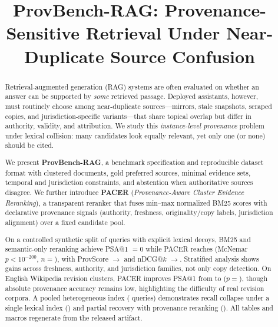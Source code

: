 \documentclass[sigconf,anonymous,review]{acmart}
\title{ProvBench-RAG: Provenance-Sensitive Retrieval Under Near-Duplicate Source Confusion}
\begin{document}
\begin{abstract}
Retrieval-augmented generation (RAG) systems are often evaluated on whether an answer can be supported by \emph{some} retrieved passage.
Deployed assistants, however, must routinely choose among near-duplicate sources---mirrors, stale snapshots, scraped copies, and jurisdiction-specific variants---that share topical overlap but differ in authority, validity, and attribution.
We study this \emph{instance-level provenance} problem under lexical collision: many candidates look equally relevant, yet only one (or none) should be cited.

We present \textbf{ProvBench-RAG}, a benchmark specification and reproducible dataset format with clustered documents, gold preferred sources, minimal evidence sets, temporal and jurisdiction constraints, and abstention when authoritative sources disagree.
We further introduce \textbf{PACER} (\emph{Provenance-Aware Cluster Evidence Reranking}), a transparent reranker that fuses min--max normalized BM25 scores with declarative provenance signals (authority, freshness, originality/copy labels, jurisdiction alignment) over a fixed candidate pool.

On a controlled synthetic split of \ProvBenchNumQueries{} queries with explicit lexical decoys, BM25 and semantic-only reranking achieve PSA@1 $=0$ while PACER reaches \ProvPacerPSA{} (McNemar $p{<}10^{-200}$, $n{=}$\McNemarN{}), with ProvScore \ProvBmProvScore{}$\rightarrow$\ProvPacerProvScore{} and nDCG@$k$ \ProvBmNDCG{}$\rightarrow$\ProvPacerNDCG{}.
Stratified analysis shows gains across freshness, authority, and jurisdiction families, not only copy detection.
On \WikiNumQueries{} English Wikipedia revision clusters, PACER improves PSA@1 from \WikiBmPSA{} to \WikiPacerPSA{} ($p{=}$\WikiMcNemarPSA{}), though absolute provenance accuracy remains low, highlighting the difficulty of real revision corpora.
A pooled heterogeneous index (\CombinedNumQueries{} queries) demonstrates recall collapse under a single lexical index (\CombinedBmRecall{}) and partial recovery with provenance reranking (\CombinedPacerRecall{}).
All tables and macros regenerate from the released artifact.
\end{abstract}

\maketitle
\end{document}
